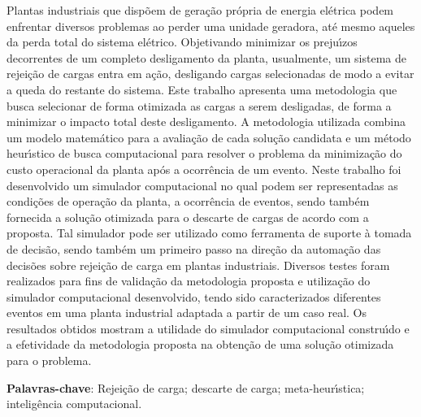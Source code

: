 \begin{resumo}

Plantas industriais que disp{\~o}em de gera{\c c}{\~a}o pr{\'o}pria de energia el{\'e}trica podem enfrentar diversos problemas ao perder uma unidade geradora, at{\'e} mesmo aqueles da perda total do sistema el{\'e}trico. Objetivando minimizar os preju{\'\i}zos decorrentes de um completo desligamento da planta, usualmente, um sistema de rejei{\c c}{\~a}o de cargas entra em a{\c c}{\~a}o, desligando cargas selecionadas de modo a evitar a queda do restante do sistema. Este trabalho apresenta uma metodologia que busca selecionar de forma otimizada as cargas a serem desligadas, de forma a minimizar o impacto total deste desligamento. A metodologia utilizada combina um modelo matem{\'a}tico para a avalia{\c c}{\~a}o de cada solu{\c c}{\~a}o candidata e um m{\'e}todo heur{\'\i}stico de busca computacional para resolver o problema da minimiza{\c c}{\~a}o do custo operacional da planta ap{\'o}s a ocorr{\^e}ncia de um evento. Neste trabalho foi desenvolvido um simulador computacional no qual podem ser representadas as condi{\c c}{\~o}es de opera{\c c}{\~a}o da planta, a ocorr{\^e}ncia de eventos, sendo tamb{\'e}m fornecida a solu{\c c}{\~a}o otimizada para o descarte de cargas de acordo com a proposta. Tal simulador pode ser utilizado como ferramenta de suporte {\`a} tomada de decis{\~a}o, sendo tamb{\'e}m um primeiro passo na dire{\c c}{\~a}o da automa{\c c}{\~a}o das decis{\~o}es sobre rejei{\c c}{\~a}o de carga em plantas industriais. Diversos testes foram realizados para fins de valida{\c c}{\~a}o da metodologia proposta e utiliza{\c c}{\~a}o do simulador computacional desenvolvido, tendo sido caracterizados diferentes eventos em uma planta industrial adaptada a partir de um caso real. Os resultados obtidos mostram a utilidade do simulador computacional constru{\'\i}do e a efetividade da metodologia proposta na obten{\c c}{\~a}o de uma solu{\c c}{\~a}o otimizada para o problema.

{\hspace{-8mm} \bf{Palavras-chave}}: Rejei{\c c}{\~a}o de carga; descarte de carga; meta-heur{\'\i}stica; intelig{\^e}ncia computacional.

\end{resumo}

